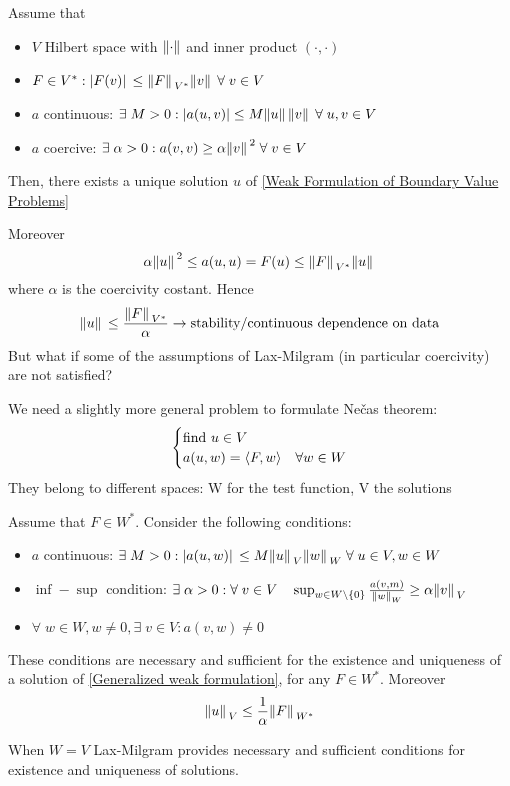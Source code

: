 \begin{background}\begin{theorem}
    Assume that 
    \begin{itemize}
        \item \(V\) Hilbert space with \(\norm{\cdot}\) and inner product \((\cdot, \cdot)\)
        \item \(F \in V^*: \abs*{F(v)} \leq \norm*{F}_{V^*}\norm*{v} \; \forall \; v \in V\)
        \item \(a\) continuous: \(\exists \; M > 0: \abs{a(u,v)} \leq M \norm*{u}\norm*{v} \; \forall \; u,v \in V\)
        \item \(a\) coercive: \(\exists \; \alpha > 0: a(v,v) \geq \alpha\norm*{v}^2 \; \forall \; v \in V\)
    \end{itemize}
    Then, there exists a unique solution \(u\) of \ref*{Weak Formulation of Boundary Value Problems}
\end{theorem}\end{background}
Moreover 
\[
    \alpha \norm*{u}^2 \leq a(u,u) = F(u) \leq \norm*{F}_{V^*} \norm*{u}
\]
where \(\alpha\) is the coercivity costant. Hence
\[
    \norm*{u} \leq \frac{\norm*{F}_{V^*}}{\alpha} \to \text{stability/continuous dependence on data}
\]
But what if some of the assumptions of Lax-Milgram (in particular coercivity) are not satisfied?

We need a slightly more general problem to formulate Nečas theorem:
\begin{equation}
    \begin{cases}
        \text{find } u \in V \\
        a(u,w) = \langle F,w \rangle & \forall w \in W \label{Generalized weak formulation}
    \end{cases}
\end{equation}
They belong to different spaces: W for the test function, V the solutions
\begin{background}\begin{theorem}[Nečas]
    Assume that \(F \in W^*\). Consider the following conditions:
    \begin{itemize}
        \item \(a\) continuous: \(\exists \; M > 0: \abs*{a(u,w)} \leq M \norm*{u}_V \norm*{w}_W \; \forall \; u \in V, w \in W\)
        \item \(\inf-\sup\) condition: \(\exists \; \alpha > 0: \forall \; v \in V \quad \sup_{w \in W \setminus \left\{0\right\}} \frac{a(v,m)}{\norm*{w}_W} \geq \alpha \norm*{v}_V\)
        \item \(\forall \; w \in W, w \neq 0, \exists \; v \in V : a(v,w) \neq 0\)
    \end{itemize}
    These conditions are necessary and sufficient for the existence and uniqueness of a solution of \ref*{Generalized weak formulation}, for any \(F \in W^*\). Moreover 
    \[
        \norm*{u}_V \leq \frac{1}{\alpha}\norm*{F}_{W^*}
    \]
\end{theorem}
\end{background}
When \(W=V\) Lax-Milgram provides necessary and sufficient conditions for existence and uniqueness of solutions.

